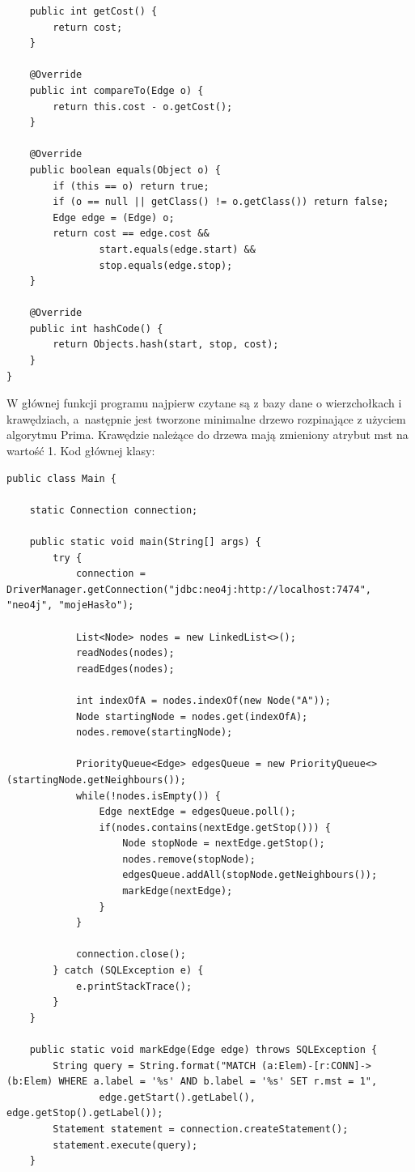 \documentclass[a4paper,9pt]{extarticle}	%
\begin{document}
\begin{enumerate}
\begin{lstlisting}
    public int getCost() {
        return cost;
    }

    @Override
    public int compareTo(Edge o) {
        return this.cost - o.getCost();
    }

    @Override
    public boolean equals(Object o) {
        if (this == o) return true;
        if (o == null || getClass() != o.getClass()) return false;
        Edge edge = (Edge) o;
        return cost == edge.cost &&
                start.equals(edge.start) &&
                stop.equals(edge.stop);
    }

    @Override
    public int hashCode() {
        return Objects.hash(start, stop, cost);
    }
}
\end{lstlisting}

W głównej funkcji programu najpierw czytane są z bazy dane o wierzchołkach i krawędziach, a~następnie jest tworzone minimalne drzewo rozpinające z użyciem algorytmu Prima. Krawędzie należące do drzewa mają zmieniony atrybut mst na wartość 1. Kod głównej klasy:
\begin{lstlisting}
public class Main {

    static Connection connection;

    public static void main(String[] args) {
        try {
            connection = DriverManager.getConnection("jdbc:neo4j:http://localhost:7474", "neo4j", "mojeHasło");

            List<Node> nodes = new LinkedList<>();
            readNodes(nodes);
            readEdges(nodes);

            int indexOfA = nodes.indexOf(new Node("A"));
            Node startingNode = nodes.get(indexOfA);
            nodes.remove(startingNode);

            PriorityQueue<Edge> edgesQueue = new PriorityQueue<>(startingNode.getNeighbours());
            while(!nodes.isEmpty()) {
                Edge nextEdge = edgesQueue.poll();
                if(nodes.contains(nextEdge.getStop())) {
                    Node stopNode = nextEdge.getStop();
                    nodes.remove(stopNode);
                    edgesQueue.addAll(stopNode.getNeighbours());
                    markEdge(nextEdge);
                }
            }

            connection.close();
        } catch (SQLException e) {
            e.printStackTrace();
        }
    }

    public static void markEdge(Edge edge) throws SQLException {
        String query = String.format("MATCH (a:Elem)-[r:CONN]->(b:Elem) WHERE a.label = '%s' AND b.label = '%s' SET r.mst = 1",
                edge.getStart().getLabel(), edge.getStop().getLabel());
        Statement statement = connection.createStatement();
        statement.execute(query);
    }


\end{lstlisting}
\end{enumerate}
\end{document}
